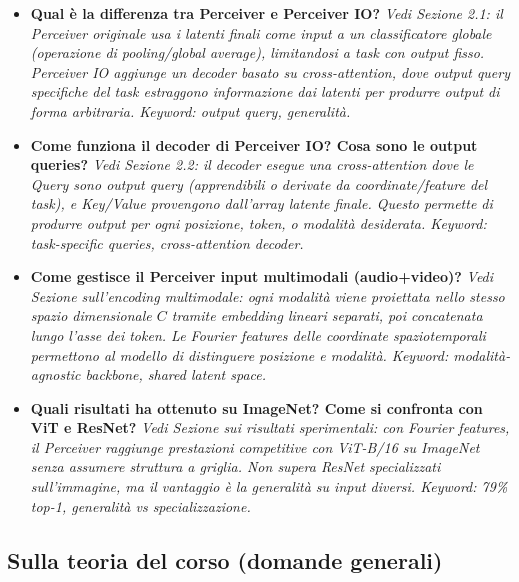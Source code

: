 \documentclass[
  11pt,
]{article}
\begin{document}
\begin{itemize}
  \item \textbf{Qual è la differenza tra Perceiver e Perceiver IO?}
  \textit{Vedi Sezione 2.1: il Perceiver originale usa i latenti finali come input a un classificatore globale (operazione di pooling/global average), limitandosi a task con output fisso. Perceiver IO aggiunge un decoder basato su cross-attention, dove output query specifiche del task estraggono informazione dai latenti per produrre output di forma arbitraria. Keyword: output query, generalità.}

  \item \textbf{Come funziona il decoder di Perceiver IO? Cosa sono le output queries?}
  \textit{Vedi Sezione 2.2: il decoder esegue una cross-attention dove le Query sono output query (apprendibili o derivate da coordinate/feature del task), e Key/Value provengono dall'array latente finale. Questo permette di produrre output per ogni posizione, token, o modalità desiderata. Keyword: task-specific queries, cross-attention decoder.}

  \item \textbf{Come gestisce il Perceiver input multimodali (audio+video)?}
  \textit{Vedi Sezione sull'encoding multimodale: ogni modalità viene proiettata nello stesso spazio dimensionale $C$ tramite embedding lineari separati, poi concatenata lungo l'asse dei token. Le Fourier features delle coordinate spaziotemporali permettono al modello di distinguere posizione e modalità. Keyword: modalità-agnostic backbone, shared latent space.}

  \item \textbf{Quali risultati ha ottenuto su ImageNet? Come si confronta con ViT e ResNet?}
  \textit{Vedi Sezione sui risultati sperimentali: con Fourier features, il Perceiver raggiunge prestazioni competitive con ViT-B/16 su ImageNet senza assumere struttura a griglia. Non supera ResNet specializzati sull'immagine, ma il vantaggio è la generalità su input diversi. Keyword: 79\% top-1, generalità vs specializzazione.}

\end{itemize}

\subsection{Sulla teoria del corso (domande generali)}
\end{document}
